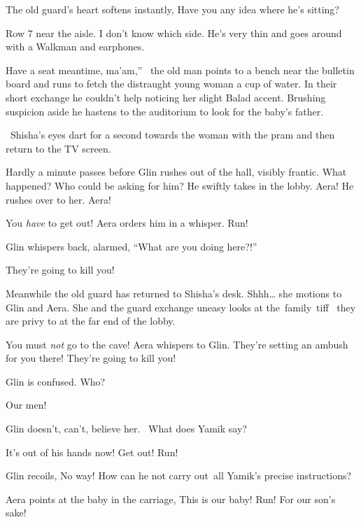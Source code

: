 \documentclass[12pt]{book}
\begin{document}
The old guard's heart softens instantly, {\textquotedbl}Have you any idea where he's sitting?{\textquotedbl}

{\textquotedbl}Row 7 near the aisle. I don't know which side. He's very thin and goes around with a Walkman and
earphones.{\textquotedbl}

{\textquotedbl}Have a seat meantime, ma'am,'' \ the old man points to a bench near the bulletin board and runs to fetch
the distraught young woman a cup of water. In their short exchange he couldn't help noticing her slight Balad accent.
Brushing suspicion aside he hastens to the auditorium to look for the baby's father.

~Shisha's eyes dart for a second towards the woman with{ }the pram and then
return to the TV screen.

Hardly a minute passes before Glin rushes out of the hall, visibly frantic. What happened? Who could be asking for him?
He swiftly takes in the lobby. Aera! He rushes over to her. {\textquotedbl}Aera!{\textquotedbl}

{\textquotedbl}You \textit{have} to get out!{\textquotedbl} Aera orders him in a whisper.
{\textquotedbl}Run!{\textquotedbl}

Glin whispers back, alarmed{, }{}``What are you doing here?!''

{\textquotedbl}They're going to kill you!{\textquotedbl}

Meanwhile the old guard has returned to Shisha's desk. {\textquotedbl}Shhh{\dots}{\textquotedbl} she motions to Glin and
Aera. She and the guard exchange {uneasy looks }at the~family~tiff \ they are
privy to at the far end of the lobby.\textbf{ }

{\textquotedbl}You\textit{ }must\textit{ not} go to the cave!{\textquotedbl} Aera whispers to Glin.
{\textquotedbl}They're setting an ambush for you there! They're going to kill you!{\textquotedbl}

Glin is confused. {\textquotedbl}Who?{\textquotedbl} \ ~

{\textquotedbl}Our men!{\textquotedbl}

Glin doesn't, can't, believe her. \ {\textquotedbl}What does Yamik say?{\textquotedbl}

{\textquotedbl}It's out of his hands now! Get out! Run! {\textquotedbl}

Glin recoils, {\textquotedbl}No way!{\textquotedbl} How can he not carry out~all Yamik's precise instructions?

Aera points at the baby in the carriage, {\textquotedbl}This is our baby! Run! For our son's sake!{\textquotedbl}~
\end{document}
